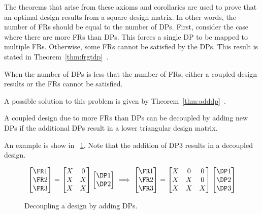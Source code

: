 The theorems that arise from these axioms and corollaries are used to prove that an optimal design results from a
square design matrix.  In other words, the number of FRs should be equal to the number of DPs.  First, consider the
case where there are more FRs than DPs.  This forces a single DP to be mapped to multiple FRs.  Otherwise, some FRs
cannot be satisfied by the DPs.  This result is stated in Theorem~\ref{thm:frgtdp}~\cite{suh}.

\begin{theorem}
  \label{thm:frgtdp}
  When the number of DPs is less that the number of FRs, either a coupled design results or the FRs cannot be
  satisfied.
\end{theorem}

A possible solution to this problem is given by Theorem~\ref{thm:adddp}~\cite{suh}.
\begin{theorem}
  \label{thm:adddp}
  A coupled design due to more FRs than DPs can be decoupled by adding new DPs if the additional DPs result in a
  lower triangular design matrix.
\end{theorem}

An example is show in \figurename~\ref{fig:dcexample}.  Note that the addition of DP3 results in a decoupled design.

\begin{figure}[H]
  \label{fig:dcexample}
  \[\begin{bmatrix}
  \FR1 \\ \FR2 \\ \FR3
  \end{bmatrix}=\begin{bmatrix}
  X & 0 \\
  X & X \\
  X & X \\
  \end{bmatrix}\begin{bmatrix}
    \DP1 \\ \DP2 \\
  \end{bmatrix}\implies\begin{bmatrix}
  \FR1 \\ \FR2 \\ \FR3
  \end{bmatrix}=\begin{bmatrix}
  X & 0 & 0 \\
  X & X & 0 \\
  X & X & X \\
  \end{bmatrix}\begin{bmatrix}
    \DP1 \\ \DP2 \\ \DP3
  \end{bmatrix}\]
  \caption{Decoupling a design by adding DPs.}
\end{figure}

